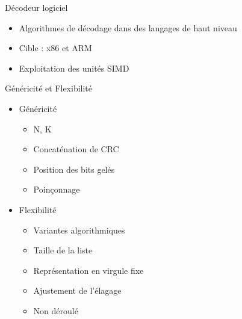 \documentclass[t,compress,mathserif,12pt,xcolor=dvipsnames]{beamer}
\begin{document}
\begin{frame}[c]{Décodeur logiciel}
	\begin{itemize}
		\item Algorithmes de décodage dans des langages de haut niveau
		\item Cible : x86 et ARM
		\item Exploitation des unités SIMD
	\end{itemize}
\end{frame}

\begin{frame}[c]{Généricité et Flexibilité}
	\begin{itemize}
		\item Généricité
		\begin{itemize}
			\item N, K
			\item Concaténation de CRC
			\item Position des bits gelés
			\item Poinçonnage
		\end{itemize}
		\item Flexibilité
		\begin{itemize}
			\item Variantes algorithmiques
			\item Taille de la liste
			\item Représentation en virgule fixe
			\item Ajustement de l'élagage
			\item Non déroulé
		\end{itemize}
	\end{itemize}
\end{frame}
\end{document}
